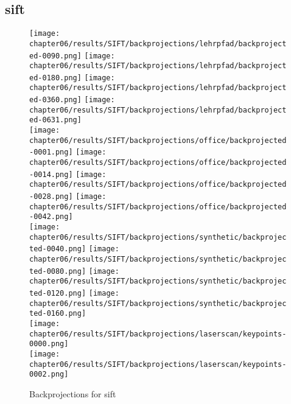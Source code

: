 \subsection{\acrshort{sift}}\label{sec:backprojection_sift}
\begin{figure}[H]
    \texttt{[image: chapter06/results/SIFT/backprojections/lehrpfad/backprojected-0090.png]}%
    \texttt{[image: chapter06/results/SIFT/backprojections/lehrpfad/backprojected-0180.png]}%
    \texttt{[image: chapter06/results/SIFT/backprojections/lehrpfad/backprojected-0360.png]}%
    \texttt{[image: chapter06/results/SIFT/backprojections/lehrpfad/backprojected-0631.png]}\\
    \texttt{[image: chapter06/results/SIFT/backprojections/office/backprojected-0001.png]}%
    \texttt{[image: chapter06/results/SIFT/backprojections/office/backprojected-0014.png]}%
    \texttt{[image: chapter06/results/SIFT/backprojections/office/backprojected-0028.png]}%
    \texttt{[image: chapter06/results/SIFT/backprojections/office/backprojected-0042.png]}\\
    \texttt{[image: chapter06/results/SIFT/backprojections/synthetic/backprojected-0040.png]}%
    \texttt{[image: chapter06/results/SIFT/backprojections/synthetic/backprojected-0080.png]}%
    \texttt{[image: chapter06/results/SIFT/backprojections/synthetic/backprojected-0120.png]}%
    \texttt{[image: chapter06/results/SIFT/backprojections/synthetic/backprojected-0160.png]}\\
    \texttt{[image: chapter06/results/SIFT/backprojections/laserscan/keypoints-0000.png]}\\
    \texttt{[image: chapter06/results/SIFT/backprojections/laserscan/keypoints-0002.png]}\\
    \caption{Backprojections for \acrshort{sift}}
\end{figure}
